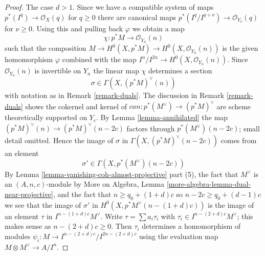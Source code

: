\begin{proof}
The case $d > 1$. Since we have a compatible system of maps
$p^*(I^q) \to \mathcal{O}_X(q)$ for $q \geq 0$ there are canonical maps
$p^*(I^q/I^{q + \nu}) \to \mathcal{O}_{Y_\nu}(q)$ for $\nu \geq 0$.
Using this and pulling back $\varphi$ we obtain a map
$$
\chi : p^*M \longrightarrow \mathcal{O}_{Y_n}(n)
$$
such that the composition
$M \to H^0(X, p^*M) \to H^0(X, \mathcal{O}_{Y_n}(n))$
is the given homomorphism $\varphi$ combined with the
map $I^n/I^{2n} \to H^0(X, \mathcal{O}_{Y_n}(n))$.
Since $\mathcal{O}_{Y_n}(n)$ is invertible on $Y_n$ the
linear map $\chi$ determines a section
$$
\sigma \in \Gamma(X, (p^*M)^\vee(n))
$$
with notation as in Remark \ref{remark-duals}.
The discussion in Remark \ref{remark-duals} shows
the cokernel and kernel of $can : p^*(M^\vee) \to (p^*M)^\vee$
are scheme theoretically supported on $Y_c$. By
Lemma \ref{lemma-annihilated} the map
$(p^*M)^\vee(n) \to (p^*M)^\vee(n - 2c)$ factors
through $p^*(M^\vee)(n - 2c)$; small detail omitted.
Hence the image of $\sigma$ in $\Gamma(X, (p^*M)^\vee(n - 2c))$
comes from an element
$$
\sigma' \in \Gamma(X, p^*(M^\vee)(n - 2c))
$$
By Lemma \ref{lemma-vanishing-coh-almost-projective} part (5),
the fact that $M^\vee$ is an $(A, n, c)$-module by
More on Algebra, Lemma \ref{more-algebra-lemma-dual-near-projective},
and the fact that $n \geq q_0 + (1 + d)c$ so $n - 2c \geq q_0 + (d - 1)c$
we see that the image of $\sigma'$ in $H^0(X, p^*M^\vee(n - (1 + d)c))$
is the image of an element $\tau$ in $I^{n - (1 + d)c}M^\vee$.
Write $\tau = \sum a_i \tau_i$ with $\tau_i \in I^{n - (2 + d)c}M^\vee$;
this makes sense as $n - (2 + d)c \geq 0$.
Then $\tau_i$ determines a homomorphism of modules
$\psi_i : M \to I^{n - (2 + d)c}/I^{2n - (2 + d)c}$
using the evaluation map $M \otimes M^\vee \to A/I^n$.


\end{proof}

